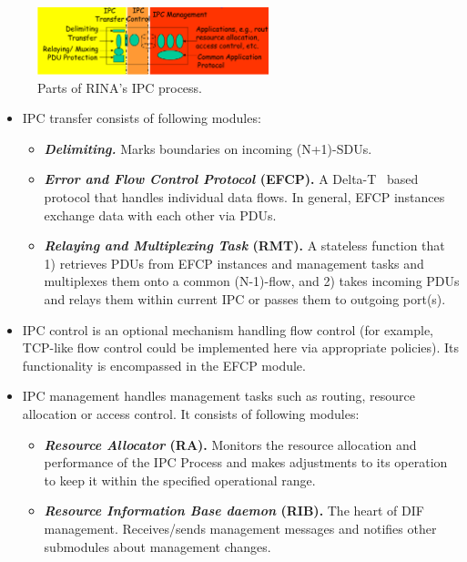                 \begin{figure}[H]
                    \begin{center}
                        \includegraphics[width=0.6\textwidth]{fig/archs_rina-ipcp.pdf}
                      \caption{Parts of RINA's IPC process.}
                      \label{fig:rina_ipcp}
                    \end{center}
                \end{figure}

                \begin{itemize}
                    \item IPC transfer consists of following modules:
                    \begin{itemize}
                        \item \textbf{\emph{Delimiting.}} Marks boundaries on incoming (N+1)-SDUs.
                        \item \textbf{\emph{Error and Flow Control Protocol} (EFCP).} A Delta-T~\cite{deltat} based protocol that handles individual data flows. In general, EFCP instances exchange data with each other via PDUs.
                        \item \textbf{\emph{Relaying and Multiplexing Task} (RMT).} A stateless function that 1) retrieves PDUs from EFCP instances and management tasks and multiplexes them onto a common (N-1)-flow, and 2) takes incoming PDUs and relays them within current IPC or passes them to outgoing port(s).
                    \end{itemize}
                    \item IPC control is an optional mechanism handling flow control (for example, TCP-like flow control could be implemented here via appropriate policies). Its functionality is encompassed in the EFCP module.
                    \item IPC management handles management tasks such as routing, resource allocation or access control. It consists of following modules:
                    \begin{itemize}
                        \item \textbf{\emph{Resource Allocator} (RA).} Monitors the resource allocation and performance of the IPC Process and makes adjustments to its operation to keep it within the specified operational range.
                        \item \textbf{\emph{Resource Information Base daemon} (RIB).} The heart of DIF management. Receives/sends management messages and notifies other submodules about management changes.
                    \end{itemize}
                \end{itemize}


